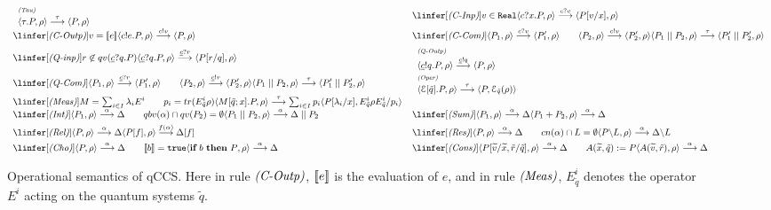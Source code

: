 \documentclass[a4paper,UKenglish,cleveref, autoref]{lipics-v2019}
\newcommand{\pair}[1]{\langle{#1}\rangle}
\newcommand{\qc}{\underline{c}}
\newcommand{\CE}{{\cal E}}
\newcommand{\ifthen}[2]{{\textbf{if} ~#1~ \textbf{then} ~#2}}
\begin{document}
\begin{figure}[h]
	\[\small\begin{array}{ll}
	\slinfer[\Rlts{Tau}]{\pair{\tau.P, \rho} \ar{\tau} \pair{P, \rho}}
	&\linfer[\Rlts{C-Inp}]{v\in\texttt{Real}}{\pair{c?x.P,\rho} \ar{c?v} \pair{P[v/x],\rho}}
	\\[3pt]
	\linfer[\Rlts{C-Outp}]{v=\Op{e}}{\pair{c!e.P,\rho} \ar{c!v} \pair{P,\rho} }
	
	&
	\linfer[\Rlts{C-Com}]{\pair{P_1,\rho}\ar{c?v}\pair{P'_1,\rho}\qquad
		\pair{P_2,\rho}\ar{c!v}\pair{P'_2,\rho}
	}
	{\pair{P_1\Cpar P_2,\rho} \ar{\tau} \pair{P'_1\Cpar P'_2,\rho} }
	\\[3pt]
	\linfer[\Rlts{Q-inp}]{r\not\in qv(\qc?q.P)}
	{\pair{\qc?q.P,\rho} \ar{\qc?r} \pair{P[r/q],\rho}}
	&
	\slinfer[\Rlts{Q-Outp}]{\pair{\qc!q.P,\rho} \ar{\qc!q} \pair{P,\rho} }
	\\[3pt]
	\linfer[\Rlts{Q-Com}]{\pair{P_1,\rho} \ar{\qc?r} \pair{P'_1,\rho} \qquad \pair{P_2,\rho}\ar{\qc!r} \pair{P'_2,\rho}}
	{\pair{P_1\Cpar P_2, \rho } \ar{\tau} \pair{P'_1\Cpar P'_2, \rho}}
	&
	\slinfer[\Rlts{Oper}]{\pair{\CE[\tilde{q}].P,\rho} \ar{\tau} \pair{P,\CE_{\tilde{q}}(\rho)}}
	\\[3pt]
	\linfer[\Rlts{Meas}]{M=\sum_{i\in I}\lambda_i E^i \qquad p_i=tr(E^i_{\tilde{q}}\rho)}
	{\pair{M[\tilde{q};x].P,\rho} \ar{\tau} \sum_{i\in I}p_i \pair{P[\lambda_i/x], E^i_{\tilde{q}}\rho E^i_{\tilde{q}} / p_i}}
	&
	\\
	\linfer[\Rlts{Int}]{\pair{P_1,\rho} \ar{\alpha} \Delta\qquad qbv(\alpha)\cap qv(P_2)=\emptyset}{\pair{P_1 \Cpar P_2,\rho} \ar{\alpha} \Delta\Cpar P_2}
	&
	\linfer[\Rlts{Sum}]{\pair{P_1,\rho} \ar{\alpha} \Delta}{\pair{P_1+P_2,\rho} \ar{\alpha} \Delta}
	\\[3pt]
	\linfer[\Rlts{Rel}]{\pair{P,\rho} \ar{\alpha} \Delta}{\pair{P[f],\rho} \ar{f(\alpha)} \Delta[f]}
	&
	\linfer[\Rlts{Res}]{\pair{P,\rho} \ar{\alpha} \Delta \qquad cn(\alpha)\cap L=\emptyset}{\pair{P\backslash L,\rho} \ar{\alpha} \Delta\backslash L}
	\\[3pt]
	\linfer[\Rlts{Cho}]{\pair{P,\rho} \ar{\alpha} \Delta \qquad \Op{b}=\texttt{true}}{\pair{\ifthen{b}{P},\rho} \ar{\alpha} \Delta}
	&
	\linfer[\Rlts{Cons}]{\pair{P[\widetilde{v}/\widetilde{x},\tilde{r}/\tilde{q}],\rho} \ar{\alpha} \Delta \qquad A(\widetilde{x}, \tilde{q})\Defs P}{\pair{A(\widetilde{v},\tilde{r}),\rho} \ar{\alpha} \Delta}
	\end{array}\]
	\caption{Operational semantics of qCCS. Here in rule $\textit{(C-Outp)}$, $\mbox{[\![}e\mbox{]\!]}$ is the evaluation of $e$, and in rule $\textit{(Meas)}$, $E^i_{\tilde{q}}$ denotes the operator $E^i$ acting on the quantum systems $\tilde{q}$.\label{fig:opsem}
	}
\end{figure}
\end{document}
